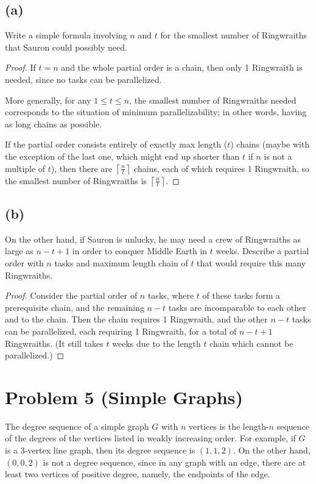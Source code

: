 \documentclass[14pt]{extarticle}
\begin{document}
\subsection{(a)} 
Write a simple formula involving $n$ and $t$ for the smallest number of Ringwraiths that Sauron could possibly need.
\begin{proof}
If $t = n$ and the whole partial order is a chain, then only 1 Ringwraith is needed, since no tasks can be parallelized.

More generally, for any $1 \leq t \leq n$, the smallest number of Ringwraiths needed corresponds to the situation of minimum parallelizability; in other words, having as long chains as possible.

If the partial order consists entirely of exactly max length ($t$) chains (maybe with the exception of the last one, which might end up shorter than $t$ if $n$ is not a multiple of $t$), then there are $\displaystyle\left\lceil \frac{n}{t} \right\rceil$ chains, each of which requires 1 Ringwraith, so the smallest number of Ringwraiths is $\displaystyle\left\lceil \frac{n}{t} \right\rceil$.
\end{proof}

\subsection{(b)} On the other hand, if Sauron is unlucky, he may need a crew of Ringwraiths as large as $n - t + 1$ in order to conquer Middle Earth in $t$ weeks. Describe a partial order with $n$ tasks and maximum length chain of $t$ that would require this many Ringwraiths.
\begin{proof}
Consider the partial order of $n$ tasks, where $t$ of these tasks form a prerequisite chain, and the remaining $n-t$ tasks are incomparable to each other and to the chain. Then the chain requires 1 Ringwraith, and the other $n-t$ tasks can be parallelized, each requiring 1 Ringwraith, for a total of $n-t+1$ Ringwraiths. (It still takes $t$ weeks due to the length $t$ chain which cannot be parallelized.)
\end{proof}

\section{Problem 5 (Simple Graphs)}
The degree sequence of a simple graph $G$ with $n$ vertices is the length-$n$ sequence of the degrees of the vertices listed in weakly increasing order. For example, if $G$ is a 3-vertex line graph, then its degree sequence is $(1,1,2)$. On the other hand, $(0,0,2)$ is not a degree sequence, since in any graph with an edge, there are at
least two vertices of positive degree, namely, the endpoints of the edge.
\end{document}
